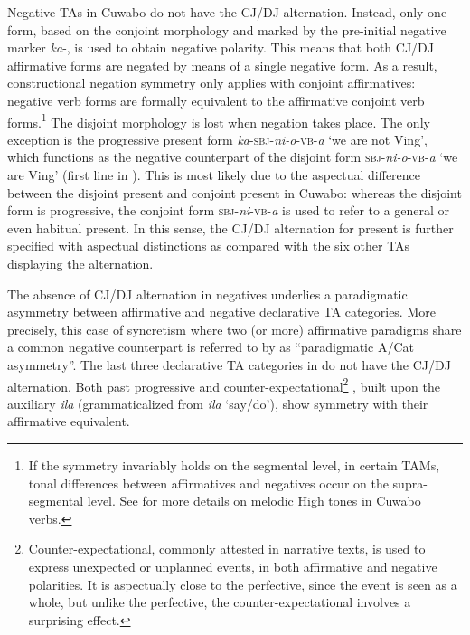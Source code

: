\documentclass[output=paper,colorlinks=true, citecolor=brown,draftmode]{langscibook}
\begin{document}
Negative TAs in Cuwabo do not have the CJ/DJ alternation. Instead, only one form, based on the conjoint morphology and marked by the pre-initial negative marker \textit{ka}{}-, is used to obtain negative polarity. This means that both CJ/DJ affirmative forms are negated by means of a single negative form. As a result, constructional negation symmetry only applies with conjoint affirmatives: negative verb forms are formally equivalent to the affirmative conjoint verb forms.\footnote{If the symmetry invariably holds on the segmental level, in certain TAMs, tonal differences between affirmatives and negatives occur on the supra-segmental level. See \citet{KisseberthGuérois2014} for more details on melodic High tones in Cuwabo verbs.} The disjoint morphology is lost when negation takes place. The only exception is the progressive present form \textit{ka}-\textsc{sbj}-\textit{ni-o}-\textsc{vb}-\textit{a} ‘we are not Ving’, which functions as the negative counterpart of the disjoint form \textsc{sbj}-\textit{ni-o}-\textsc{vb}-\textit{a} ‘we are Ving’ (first line in ). This is most likely due to the aspectual difference between the disjoint present and conjoint present in Cuwabo: whereas the disjoint form is progressive, the conjoint form \textsc{sbj}-\textit{ni}-\textsc{vb}-\textit{a} is used to refer to a general or even habitual present. In this sense, the CJ/DJ alternation for present is further specified with aspectual distinctions as compared with the six other TAs displaying the alternation.

The absence of CJ/DJ alternation in negatives underlies a paradigmatic asymmetry between affirmative and negative declarative TA categories. More precisely, this case of syncretism where two (or more) affirmative paradigms share a common negative counterpart is referred to by \citet{Miestamo2005} as “paradigmatic A/Cat asymmetry”. 
\largerpage
The last three declarative TA categories in  do not have the CJ/DJ alternation. Both past progressive  and counter-expectational\footnote{Counter-expectational, commonly attested in narrative texts, is used to express unexpected or unplanned events, in both affirmative and negative polarities. It is aspectually close to the perfective, since the event is seen as a whole, but unlike the perfective, the counter-expectational involves a surprising effect.} , built upon the auxiliary \textit{ila} (grammaticalized from \textit{ila} ‘say/do’), show symmetry with their affirmative equivalent.
\end{document}
